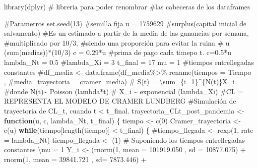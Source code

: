 \documentclass[
  us-letterpaper,
]{scrreprt}
\newenvironment{Shaded}{\begin{snugshade}}{\end{snugshade}}
\newcommand{\AttributeTok}[1]{\textcolor[rgb]{0.40,0.45,0.13}{#1}}
\newcommand{\CommentTok}[1]{\textcolor[rgb]{0.37,0.37,0.37}{#1}}
\newcommand{\ControlFlowTok}[1]{\textcolor[rgb]{0.00,0.23,0.31}{\textbf{#1}}}
\newcommand{\DecValTok}[1]{\textcolor[rgb]{0.68,0.00,0.00}{#1}}
\newcommand{\FloatTok}[1]{\textcolor[rgb]{0.68,0.00,0.00}{#1}}
\newcommand{\FunctionTok}[1]{\textcolor[rgb]{0.28,0.35,0.67}{#1}}
\newcommand{\NormalTok}[1]{\textcolor[rgb]{0.00,0.23,0.31}{#1}}
\newcommand{\OtherTok}[1]{\textcolor[rgb]{0.00,0.23,0.31}{#1}}
\newcommand{\SpecialCharTok}[1]{\textcolor[rgb]{0.37,0.37,0.37}{#1}}
\theoremstyle{plain}
\theoremstyle{plain}
\theoremstyle{definition}
\theoremstyle{remark}
\begin{document}
\begin{Shaded}
\begin{Highlighting}[]
\FunctionTok{library}\NormalTok{(dplyr) }\CommentTok{\# libreria para poder renombrar }
\CommentTok{\#las cabeceras de los dataframes}

\CommentTok{\#Parametros}
\FunctionTok{set.seed}\NormalTok{(}\DecValTok{13}\NormalTok{) }\CommentTok{\#semilla fija}
\NormalTok{u }\OtherTok{=} \DecValTok{1759629} \CommentTok{\#surplus(capital inicial de salvamento)}
\CommentTok{\#Es un estimado a partir de la media de las ganancias por semana, }
\CommentTok{\#multiplicado por 10/3, }
\CommentTok{\#siendo una proporción para evitar la ruina}
\CommentTok{\# u (sum(medias))*(10/3)}
\NormalTok{c }\OtherTok{=} \FloatTok{0.29}\SpecialCharTok{*}\NormalTok{u }\CommentTok{\#prima de pago cada timepo t. c=0.5*u}
\NormalTok{lambda\_Nt }\OtherTok{=} \FloatTok{0.5}
\CommentTok{\#lambda\_Xi = 3}
\NormalTok{t\_final }\OtherTok{=} \DecValTok{17}
\NormalTok{mu }\OtherTok{=} \DecValTok{1} \CommentTok{\#tiempos entrellegadas constantes}
\CommentTok{\#df\_media \textless{}{-} data.frame(df\_media\%\textgreater{}\% rename(tiempos = Tiempo , }
\CommentTok{\#media\_trayectoria = cramer\_media)}
\CommentTok{\# S(t) = \textbackslash{}sum\_\{i=1\}\^{}\{N(t)\}X\_i}
\CommentTok{\#donde N(t)\textasciitilde{} Poisson (lambda*t)}
\CommentTok{\# X\_i \textasciitilde{} exponencial (lambda\_Xi)}
\CommentTok{\#CL = REPRESENTA EL MODELO DE CRAMER LUNDBERG}
\CommentTok{\#Simulación de trayectoria de CL\_t, cuando t \textless{} t\_final.}
\NormalTok{trayectoria\_CLt\_post\_pandemia }\OtherTok{\textless{}{-}} \ControlFlowTok{function}\NormalTok{(u, c, lambda\_Nt, t\_final)}
\NormalTok{\{}
\NormalTok{  tiempo }\OtherTok{\textless{}{-}} \FunctionTok{c}\NormalTok{(}\DecValTok{0}\NormalTok{)}
\NormalTok{  Cramer\_trayectoria }\OtherTok{\textless{}{-}} \FunctionTok{c}\NormalTok{(u)}
  \ControlFlowTok{while}\NormalTok{(tiempo[}\FunctionTok{length}\NormalTok{(tiempo)] }\SpecialCharTok{\textless{}}\NormalTok{ t\_final)}
\NormalTok{  \{}
    \CommentTok{\#tiempo\_llegada \textless{}{-} rexp(1, rate = lambda\_Nt)}
\NormalTok{    tiempo\_llegada }\OtherTok{\textless{}{-}}\NormalTok{ (}\DecValTok{1}\NormalTok{) }
\CommentTok{\# Suponiendo los tiempos entrellegadas constantes \textbackslash{}mu = 1}
\NormalTok{    Y\_i }\OtherTok{\textless{}{-}}\NormalTok{  (}\FunctionTok{rnorm}\NormalTok{(}\DecValTok{1}\NormalTok{, }\AttributeTok{mean =} \FloatTok{101919.050}\NormalTok{ , }\AttributeTok{sd =} \FloatTok{10877.075}\NormalTok{)  }\SpecialCharTok{+} 
               \FunctionTok{rnorm}\NormalTok{(}\DecValTok{1}\NormalTok{, }\AttributeTok{mean =}  \FloatTok{39841.721}\NormalTok{ , }\AttributeTok{sd=} \FloatTok{7873.446}\NormalTok{)  }\SpecialCharTok{+}  

\end{Highlighting}
\end{Shaded}
\end{document}
